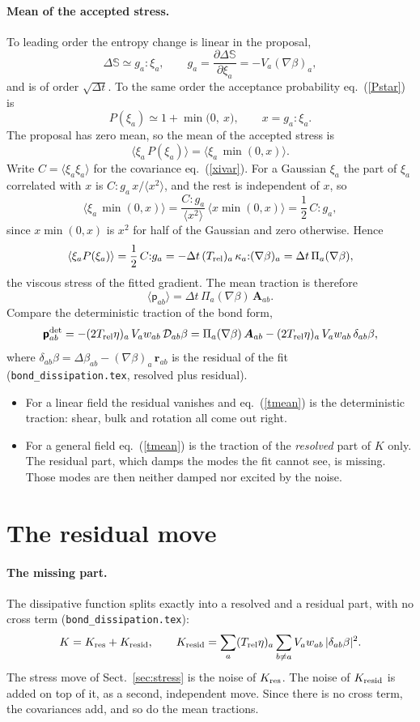 \documentclass[11pt,aps,preprint,nofootinbib,superscriptaddress,tightenlines]{revtex4-2}
\def\st{\begin{equation}}
\def\stp{\end{equation}}
\def\Eq#1{eq.~(\ref{#1})}
\def\Sect#1{Sect.~\ref{#1}}
\newcommand{\pf}{\bm{\mathsf p}}
\newcommand{\avg}[1]{\langle #1\rangle}
\let\oldparagraph\paragraph
\renewcommand{\paragraph}{\par\bigskip\oldparagraph}
\begin{document}
\paragraph{Mean of the accepted stress.}  To leading order the entropy change is
linear in the proposal,
\st
\Delta\mathbb S\simeq g_a{:}\xi_a ,\qquad
g_a=\frac{\partial\Delta\mathbb S}{\partial\xi_a}=-V_a(\nabla\beta)_a ,
\stp
and is of order $\sqrt{\Delta t}$.  To the same order the acceptance probability
\Eq{Pstar} is
\st
P(\xi_a)\simeq1+\min\big(0,\ x\big),\qquad x=g_a{:}\xi_a .
\stp
The proposal has zero mean, so the mean of the accepted stress is
\st
\avg{\xi_a\,P(\xi_a)}=\avg{\xi_a\,\min(0,x)} .
\stp
Write $C=\avg{\xi_a\xi_a}$ for the covariance \Eq{xivar}.  For a Gaussian $\xi_a$
the part of $\xi_a$ correlated with $x$ is $C{:}g_a\,x/\avg{x^2}$, and the
rest is independent of $x$, so
\st
\avg{\xi_a\,\min(0,x)}=\frac{C{:}g_a}{\avg{x^2}}\,\avg{x\min(0,x)}
=\frac12\,C{:}g_a ,
\stp
since $x\min(0,x)$ is $x^2$ for half of the Gaussian and zero otherwise.  Hence
\st
\avg{\xi_aP(\xi_a)}=\frac12\,C{:}g_a
=-\Delta t\,(T_{\rm rel})_a\,\kappa_a{:}(\nabla\beta)_a=\Delta t\,\Pi_a(\nabla\beta) ,
\stp
the viscous stress of the fitted gradient.  The mean traction is therefore
\st
\avg{\pf_{ab}}=\Delta t\,\Pi_a(\nabla\beta)\,\bm A_{ab} .
\label{tmean}
\stp
Compare the deterministic traction of the bond form,
\st
\pf_{ab}^{\rm det}=-(2T_{\rm rel}\eta)_a\,V_aw_{ab}\,\mathcal D_{ab}\beta
=\Pi_a(\nabla\beta)\,\bm A_{ab}-(2T_{\rm rel}\eta)_a\,V_aw_{ab}\,\delta_{ab}\beta,
\stp
where $\delta_{ab}\beta=\Delta\beta_{ab}-(\nabla\beta)_a\,\bm r_{ab}$ is the residual of the fit
(\texttt{bond\_dissipation.tex}, resolved plus residual).
\begin{itemize}
\item For a linear field the residual vanishes and \Eq{tmean} is the
  deterministic traction: shear, bulk and rotation all come out right.
\item For a general field \Eq{tmean} is the traction of the \emph{resolved} part
  of $K$ only.  The residual part, which damps the modes the fit cannot see, is
  missing.  Those modes are then neither damped nor excited by the noise.
\end{itemize}
\section{The residual move}
\label{sec:resid}

\paragraph{The missing part.}  The dissipative function splits exactly into a
resolved and a residual part, with no cross term
(\texttt{bond\_dissipation.tex}):
\st
K=K_{\rm res}+K_{\rm resid},\qquad
K_{\rm resid}=\sum_a(T_{\rm rel}\eta)_a\sum_{b\neq a}V_aw_{ab}\,|\delta_{ab}\beta|^2 .
\stp
The stress move of \Sect{sec:stress} is the noise of $K_{\rm res}$.  The noise of
$K_{\rm resid}$ is added on top of it, as a second, independent move.  Since there
is no cross term, the covariances add, and so do the mean tractions.
\end{document}
